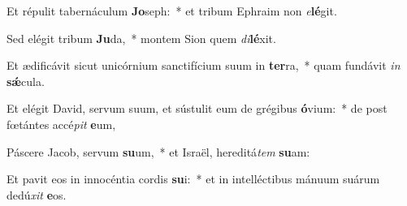 \item Et répulit tabernáculum \textbf{Jo}seph:~* et tribum Ephraim non \textit{e}\textbf{lé}git.
\item Sed elégit tribum \textbf{Ju}da,~* montem Sion quem \textit{di}\textbf{lé}xit.
\item Et ædificávit sicut unicórnium sanctifícium suum in \textbf{ter}ra,~* quam fundávit \textit{in} \textbf{sǽ}cula.
\item Et elégit David, servum suum, et sústulit eum de grégibus \textbf{ó}vium:~* de post fœtántes accé\textit{pit} \textbf{e}um,
\item Páscere Jacob, servum \textbf{su}um,~* et Israël, hereditá\textit{tem} \textbf{su}am:
\item Et pavit eos in innocéntia cordis \textbf{su}i:~* et in intelléctibus mánuum suárum dedú\textit{xit} \textbf{e}os.
